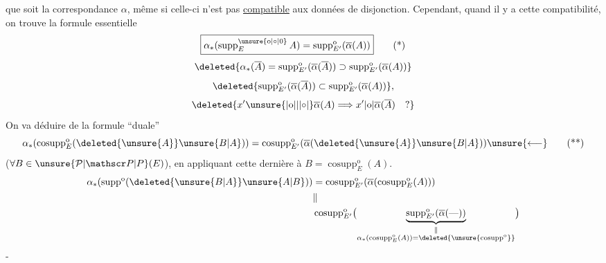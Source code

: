 que soit la correspondance $\alpha$, même si celle-ci n'est pas \uline{compatible} aux données de disjonction. Cependant, quand il y a cette compatibilité, on trouve la formule essentielle
\[
\boxed{\alpha_*(\operatorname{supp}^{\unsure{\mathrm{o}|\circ|0}}_E A)=\operatorname{supp}^{\mathrm{o}}_{E'}(\overline\alpha(A))}\tag*{(*)}
\]
\deleted{$\unsure{\alpha_*(}$}
\[
\deleted{\alpha_*(\overline A)=\operatorname{supp}^{\mathrm{o}}_{E'}(\overline\alpha(\overline A))\supset\operatorname{supp}^{\mathrm{o}}_{E'}(\overline\alpha(A))}
\]
\[
\deleted{\operatorname{supp}^{\mathrm{o}}_{E'}(\overline\alpha(\overline A))\subset\operatorname{supp}^{\mathrm{o}}_{E'}(\overline\alpha(A))},
\]
\[
\deleted{x'\unsure{|\mathrm{o}||\lvert\circ\rvert}\overline\alpha(A)\Longrightarrow x'|\mathrm{o}|\overline\alpha(\overline A)\quad ?}
\]
On va  déduire de la formule ``duale''
\[
\alpha_*(\operatorname{cosupp}^{\mathrm{o}}_E(\deleted{\unsure{A}}\unsure{B|A}))=\operatorname{cosupp}^{\mathrm{o}}_{E'}(\overline\alpha(\deleted{\unsure{A}}\unsure{B|A}))\unsure{\longleftarrow}
\tag*{(**)}
\]
($\forall B\in\unsure{\mathcal P|\mathscr P|P}(E)$), en appliquant cette dernière  à $B=\operatorname{cosupp}^{\mathrm{o}}_E(A)$.
\[
\begin{aligned}
\alpha_*(\operatorname{supp}^{\mathrm{o}}(\deleted{\unsure{B|A}}\unsure{A|B}))
&=\operatorname{cosupp}^{\mathrm{o}}_{E'}(\overline\alpha(\operatorname{cosupp}^{\mathrm{o}}_E(A)))\\
&\begin{aligned}&\Vert\\
&\operatorname{cosupp}^{\mathrm{o}}_{E'}\bigl(\underbrace{\operatorname{supp}^{\mathrm{o}}_{E'}(\overline\alpha(\text{---}))}_{\substack{\Vert\\\alpha_*(\operatorname{cosupp}^{\mathrm{o}}_E(A))=\deleted{\unsure{\operatorname{cosupp}^{\mathrm{o}}}}}}\bigr)
\end{aligned}
\end{aligned}
\]
-

